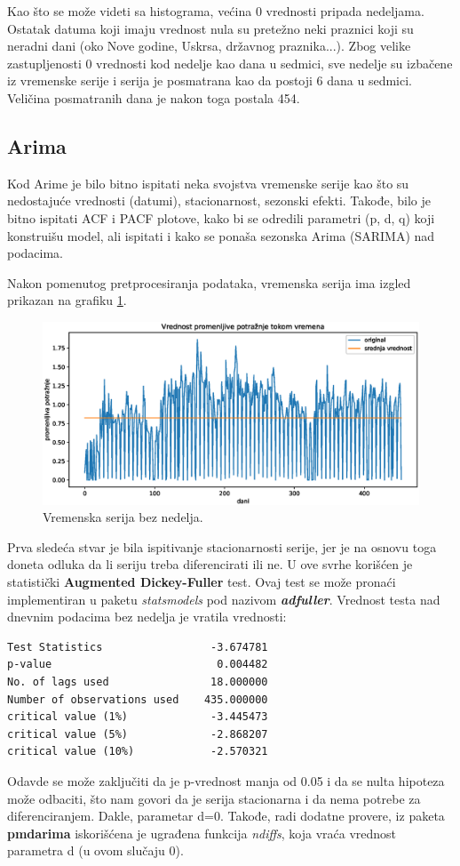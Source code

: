 \documentclass[12pt,oneside]{memoir}
\begin{document}
Kao što se može videti sa histograma, većina 0 vrednosti pripada nedeljama. Ostatak datuma koji imaju vrednost nula su pretežno neki praznici koji su neradni dani (oko Nove godine, Uskrsa, državnog praznika...). Zbog velike zastupljenosti 0 vrednosti kod nedelje kao dana u sedmici, sve nedelje su izbačene iz vremenske serije i serija je posmatrana kao da postoji 6 dana u sedmici. Veličina posmatranih dana je nakon toga postala 454.

\subsection{Arima}
Kod Arime je bilo bitno ispitati neka svojstva vremenske serije kao što su nedostajuće vrednosti (datumi), stacionarnost, sezonski efekti. Takođe, bilo je bitno ispitati ACF i PACF plotove, kako bi se odredili parametri (p, d, q) koji konstruišu model, ali ispitati i kako se ponaša sezonska Arima (SARIMA) nad podacima.

Nakon pomenutog pretprocesiranja podataka, vremenska serija ima izgled prikazan na grafiku \ref{fig: dnevna_vremenska_serija_bez_nedelja}. 

\begin{figure}[!ht]
  \centering
  \includegraphics[width=1\textwidth]{./grafici/vremenska_serija_primer_bez_nedelja.eps}
  \caption{Vremenska serija bez nedelja.}
  \label{fig: dnevna_vremenska_serija_bez_nedelja}
\end{figure}

Prva sledeća stvar je bila ispitivanje stacionarnosti serije, jer je na osnovu toga doneta odluka da li seriju treba diferencirati ili ne. U ove svrhe korišćen je statistički \textbf{Augmented Dickey-Fuller} test. Ovaj test se može pronaći implementiran u paketu \textit{statsmodels} pod nazivom \textbf{\textit{adfuller}}. Vrednost testa nad dnevnim podacima bez nedelja je vratila vrednosti:
\begin{verbatim}
Test Statistics                 -3.674781
p-value                          0.004482
No. of lags used                18.000000
Number of observations used    435.000000
critical value (1%)             -3.445473
critical value (5%)             -2.868207
critical value (10%)            -2.570321
\end{verbatim}
Odavde se može zaključiti da je p-vrednost manja od 0.05 i da se nulta hipoteza može odbaciti, što nam govori da je serija stacionarna i da nema potrebe za diferenciranjem. Dakle, parametar d=0. Takođe, radi dodatne provere, iz paketa \textbf{pmdarima} iskorišćena je ugrađena funkcija \textit{ndiffs}, koja vraća vrednost parametra d (u ovom slučaju 0).
\end{document}
